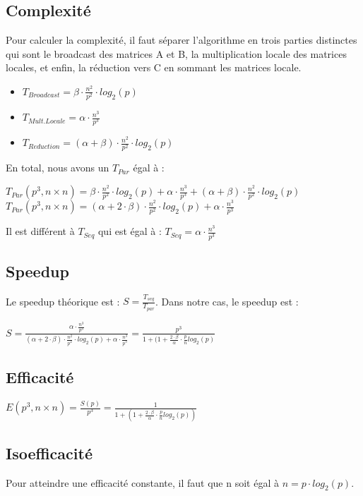 \documentclass[a4paper]{article}
\begin{document}
\subsection{Complexité}
Pour calculer la complexité, il faut séparer l'algorithme en trois parties distinctes qui sont le broadcast des matrices A et B, la multiplication locale des matrices locales, et enfin, la réduction vers C en sommant les matrices locale.
\begin{itemize}
\item $T_{Broadcast} = \beta \cdot \frac{n^2}{p^2} \cdot log_2(p)$
\item $T_{Mult. Locale} = \alpha \cdot \frac{n^3}{p^3} $
\item $T_{Reduction} = (\alpha + \beta) \cdot \frac{n^2}{p^2} \cdot log_2(p)$ 
\end{itemize}
En total, nous avons un $T_{Par}$ égal à :
\begin{center}
$T_{Par}(p^3, n \times n) = \beta \cdot \frac{n^2}{p^2} \cdot log_2(p) + \alpha \cdot \frac{n^3}{p^3} + (\alpha + \beta) \cdot \frac{n^2}{p^2} \cdot log_2(p)$ \\
$T_{Par}(p^3, n \times n) = (\alpha + 2 \cdot \beta) \cdot \frac{n^2}{p^2} \cdot log_2(p) + \alpha \cdot \frac{n^3}{p^3}$
\end{center}
Il est différent à $T_{Seq}$ qui est égal à : $T_{Seq} = \alpha \cdot \frac{n^3}{p^3}$
\subsection{Speedup}
Le speedup théorique est : $S = \frac{T_{seq}}{T_{par}}$. Dans notre cas, le speedup est :
\begin{center}
$S = \frac{\alpha \cdot \frac{n^3}{p^3}}{(\alpha + 2 \cdot \beta) \cdot \frac{n^2}{p^2} \cdot log_2(p) + \alpha \cdot \frac{n^3}{p^3}} = \frac{p^3}{1 + ( 1 + \frac{2 \cdot \beta}{\alpha} \cdot \frac{p}{n} log_2 (p)}$
\end{center}
\subsection{Efficacité}
\begin{center}
$E(p^3, n \times n) = \frac{S(p)}{p^3} = \frac{1}{1 + ( 1 + \frac{2 \cdot \beta}{\alpha} \cdot \frac{p}{n} log_2 (p) )}$
\end{center}
\subsection{Isoefficacité}
Pour atteindre une efficacité constante, il faut que n soit égal à $n = p \cdot log_2(p)$.
\end{document}
